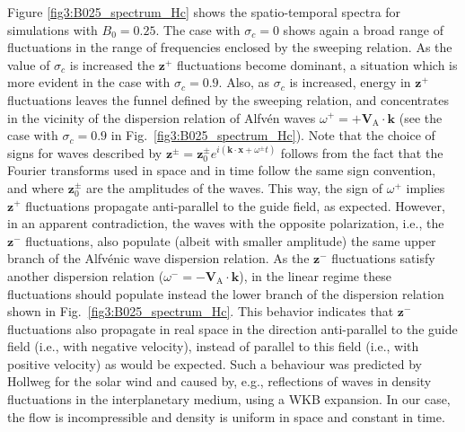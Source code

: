 \documentclass[aip,pop,reprint,amsmath,amssymb,floatfix]{revtex4-1}
\renewcommand{\vec}[1]{\mathbf{#1}}
\begin{document}
Figure \ref{fig3:B025_spectrum_Hc} shows the spatio-temporal spectra
for simulations with $B_0=0.25$. The case with $\sigma_c=0$ shows again a
broad range of fluctuations in the range of frequencies enclosed by
the sweeping relation. As the value of $\sigma_c$ is increased the
$\vec{z}^+$ fluctuations become dominant, a situation which is more
evident in the case with $\sigma_c=0.9$. Also, as $\sigma_c$ is increased,
energy in $\vec{z}^+$ fluctuations leaves the funnel defined by the
sweeping relation, and concentrates in the vicinity of the dispersion
relation of Alfv\'en waves
$\omega^+ = +\vec{V}_\textrm{A} \cdot \vec{k}$ (see the case with
$\sigma_c=0.9$ in Fig.~\ref{fig3:B025_spectrum_Hc}). Note that the choice of signs
for waves described by $\vec{z}^\pm={\vec z}_0^\pm e^{i(\vec{k} \cdot \vec{x}+\omega^\pm t)}$
follows from the fact that the Fourier
transforms used in space and in time follow the same sign convention,
and where ${\vec z}_0^\pm$ are the amplitudes of the waves. 
This way, the sign
of $\omega^+$ implies $\vec{z}^+$ fluctuations propagate anti-parallel
to the guide field, as expected. However, in an apparent
contradiction, the waves with the opposite polarization, i.e., the
$\vec{z}^-$ fluctuations, also populate (albeit with smaller
amplitude) the same upper branch of the Alfv\'enic wave dispersion
relation. As the $\vec{z}^-$ fluctuations satisfy another dispersion
relation ($\omega^- = -\vec{V}_\textrm{A} \cdot \vec{k}$), in the
linear regime these fluctuations should populate instead the lower
branch of the dispersion relation shown in
Fig.~\ref{fig3:B025_spectrum_Hc}. This behavior indicates that
$\vec{z}^-$ fluctuations also propagate in real space in the direction
anti-parallel to the guide field (i.e., with negative velocity),
instead of parallel to this field (i.e., with positive velocity) as
would be expected. Such a behaviour was predicted by Hollweg 
\cite{hollweg_1990_wkb} for the solar wind and caused by, e.g., 
reflections of waves in density fluctuations in the interplanetary medium, 
using a WKB expansion. In our case, the flow is incompressible and density 
is uniform in space and constant in time.
\end{document}
